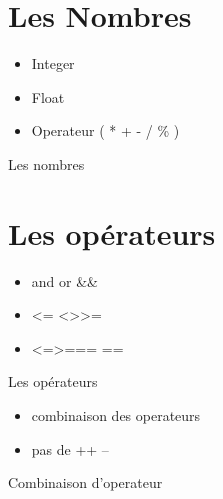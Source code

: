 \documentclass{beamer}
\begin{document}
\section{Les Nombres}

\begin{frame}
  \begin{itemize}
    \item Integer
    \item Float
    \item Operateur ( * + - / \% )
  \end{itemize}
\end{frame}

\begin{frame}
  \begin{beamerboxesrounded}{Les nombres}
    
  \end{beamerboxesrounded}
\end{frame}

\section{Les opérateurs}

\begin{frame}
  \begin{itemize}
    \item and or \&\& \textbar\textbar
    \item \textless= \textless \textgreater \textgreater=
    \item \textless=\textgreater === ==
  \end{itemize}
\end{frame}

\begin{frame}
  \begin{beamerboxesrounded}{Les op\'erateurs}
    
  \end{beamerboxesrounded}
\end{frame}

\begin{frame}
  \begin{itemize}
    \item combinaison des operateurs
    \item pas de ++ --
  \end{itemize}
\end{frame}

\begin{frame}
  \begin{beamerboxesrounded}{Combinaison d'operateur}
    
  \end{beamerboxesrounded}
\end{frame}
\end{document}

